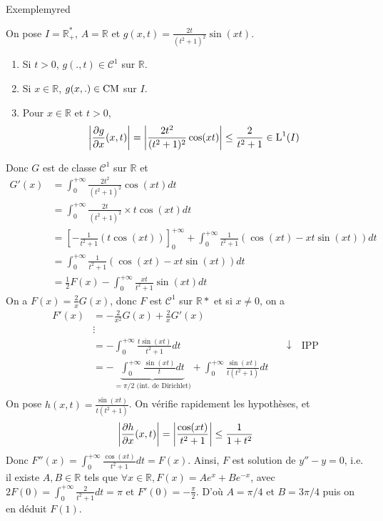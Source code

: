 \begin{omed}{Exemple}{myred}
\begin{itemize}
            On pose $I = \mathbb{R}^*_+$, $A = \mathbb{R}$ et $g(x,t) = \frac{2t}{(t^2 + 1)^2} \sin(xt)$.
            \begin{enumerate}
                \item Si $t > 0$, $g(.,t) \in \mathcal{C}^1$ sur $\mathbb{R}$.
                \item Si $x \in \mathbb{R}$, $g(x,.) \in \operatorname{CM}$ sur $I$.
                \item Pour $x \in \mathbb{R}$ et $t > 0$, 
                \[ \left\lvert \frac{\partial g}{\partial x}(x,t)\right\rvert = \left\lvert \frac{2t^2}{(t^2 + 1)^2} \cos(xt)\right\rvert \leq \frac{2}{t^2 + 1} \in \operatorname{L}^1(I) \]   
            \end{enumerate}
            Donc $G$ est de classe $\mathcal{C}^1$ sur $\mathbb{R}$ et 
            \begin{align*}
                G'(x) &= \int_{0}^{+\infty} \frac{2t^2}{(t^2 + 1)^2} \cos(xt) dt \\
                &= \int_{0}^{+\infty} \frac{2t}{(t^2 + 1)^2} \times t \cos(xt) dt \\
                &= \left[-\frac{1}{t^2 + 1}(t \cos(xt))\right]_0^{+\infty} + \int_{0}^{+\infty} \frac{1}{t^2 + 1} (\cos(xt) - xt \sin(xt)) dt \\
                &= \int_{0}^{+\infty} \frac{1}{t^2 + 1} \left(\cos(xt) - xt \sin(xt)\right)dt \\
                &= \frac{1}{2} F(x) - \int_{0}^{+\infty} \frac{xt}{t^2 + 1} \sin(xt) dt 
            \end{align*}
            On a $F(x) = \frac{2}{x} G(x)$, donc $F$ est $\mathcal{C}^1$ sur $\mathbb{R}*$ et si $x \neq 0$, on a 
            \begin{align*}
                F'(x) &= -\frac{2}{x^2} G(x) + \frac{2}{x} G'(x) \\
                    &\vdots \\
                    &= - \int_{0}^{+\infty} \frac{t \sin(xt)}{t^2 + 1} dt 
                    &\quad \downarrow \quad \text{IPP} \\
                    &= - \underbrace{\int_{0}^{+\infty} \frac{\sin(xt)}{t} dt}_{= \pi / 2 \text{ (int. de Dirichlet)}} + \int_{0}^{+\infty} \frac{\sin(xt)}{t(t^2 + 1)} dt \\
            \end{align*}
            On pose $h(x,t) = \frac{\sin(xt)}{t(t^2 + 1)}$. On vérifie rapidement les hypothèses, et 
            \[ \left\lvert \frac{\partial h}{\partial x}(x,t)\right\rvert = \left\lvert \frac{\cos(xt)}{t^2 + 1}\right\rvert \leq \frac{1}{1 + t^2} \]   
            Donc $F''(x) = \int_{0}^{+\infty} \frac{\cos(xt)}{t^2 + 1} dt = F(x)$. Ainsi, $F$ est solution de $y'' - y = 0$, i.e. il existe $A,B \in \mathbb{R}$ tels que $\forall x \in \mathbb{R}, F(x) = Ae^x + Be^{-x}$, avec $2 F(0) = \int_{0}^{+\infty} \frac{2}{t^2 + 1} dt = \pi$ et $F'(0) = -\frac{\pi}{2}$. D’où $A = \pi / 4$ et $B = 3 \pi /4$ puis on en déduit $F(1)$.
        \end{itemize}
    \end{omed}

